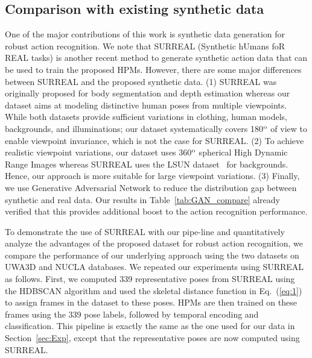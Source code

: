 \documentclass[twocolumn]{svjour3}          \smartqed  \usepackage{graphicx}
\begin{document}
\vspace{-3mm}

\subsection{Comparison with existing synthetic data}
One of the major contributions of this work is synthetic data generation for robust action recognition. We note that SURREAL (Synthetic hUmans foR REAL tasks) \citep{varol17} is another recent method to generate synthetic action data that can be used to train the proposed HPMs. However, there are some major differences between SURREAL and the proposed synthetic data. (1) SURREAL was originally  proposed for body segmentation and depth estimation whereas our  dataset aims at modeling distinctive human poses from multiple viewpoints. While both datasets provide sufficient variations in clothing, human models, backgrounds, and illuminations; our dataset systematically covers 180$^{\rm o}$ of view to enable  viewpoint invariance, which is not the case for SURREAL. (2) To achieve realistic viewpoint variations, our dataset uses 360$^{\rm o}$ spherical High Dynamic Range Images whereas SURREAL uses the LSUN dataset~\citep{journals/corr/YuZSSX15} for backgrounds. Hence, our approach is more suitable for  large viewpoint variations. (3) Finally, we use Generative Adversarial Network to reduce the distribution gap between synthetic and real data. Our results in Table~\ref{tab:GAN_compare} already verified that this provides additional boost to the action recognition performance.

To demonstrate the use of SURREAL with our pipe-line and  quantitatively  analyze the advantages of the proposed dataset for robust action recognition, we compare the performance of our underlying approach using the two datasets on UWA3D and NUCLA databases.  
We repeated our experiments  using SURREAL as follows. First, we computed 339 representative poses from SURREAL using the HDBSCAN algorithm \citep{mcinnes2017hdbscan}  and  used the skeletal distance function in Eq.~(\ref{eq:1}) to assign frames in the dataset to these poses. 
HPMs are then trained on these frames using the 339 pose labels, followed by temporal encoding and classification. This pipeline is exactly the same as the one used for our data in Section~\ref{sec:Exp}, except that the representative poses are now  computed using SURREAL.
\end{document}
